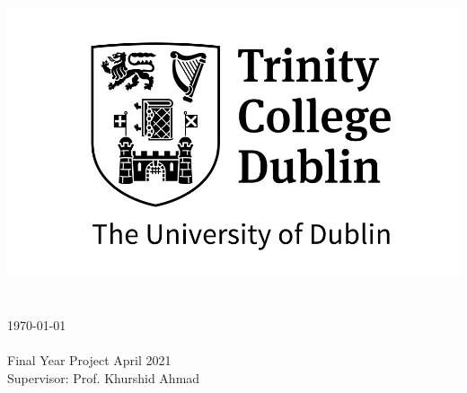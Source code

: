 \begin{titlepage}

\center %


\includegraphics[scale=1.3]{title/black-stacked-trinity.jpg}\\[1cm] 


\makeatletter
{ \huge \bfseries \thesistitle}\\[1.5cm] %
 
\Large\authorname\\
{\large \today}\\[1cm] %

 
\degree\\
Final Year Project  April 2021\\
Supervisor: Prof. Khurshid Ahmad\\[2cm]

\vfill

\Large \school\\[0.5cm]
\Large \schoolAddress

\vfill %

\end{titlepage}